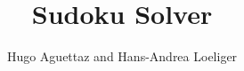 \documentclass{beamer}
\title{Sudoku Solver}
\author{Hugo Aguettaz and Hans-Andrea Loeliger}
\institute{Institut für Signal- und Informationsverarbeitung\\ETH Zürich}
\begin{document}
	\begin{frame}
		\titlepage
	\end{frame} 
\end{document}
